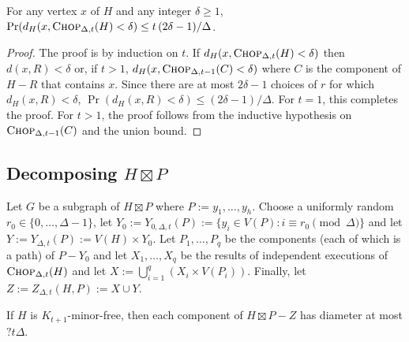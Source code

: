 \documentclass{patmorin}
\newcommand{\defin}[1]{\emph{\textcolor{brightmaroon}{#1}}}
\begin{document}

\begin{lem}\label{delta_bad_h}
  For any vertex $x$ of $H$ and any integer $\delta\ge 1$, $\Pr(d_H(x, \textsc{Chop}_{\Delta,t}(H)< \delta)\le t\,(2\delta-1)/\Delta$.
\end{lem}

\begin{proof}
  The proof is by induction on $t$.
  If $d_H(x,\textsc{Chop}_{\Delta,t}(H) < \delta)$ then $d(x,R)< \delta$ or, if $t>1$,  $d_H(x,\textsc{Chop}_{\Delta,t-1}(C) < \delta)$ where $C$ is the component of $H-R$ that contains $x$.  Since there are at most $2\delta-1$ choices of $r$ for which $d_H(x,R)<\delta$, $\Pr(d_H(x,R)<\delta) \le (2\delta-1)/\Delta$. For $t=1$, this completes the proof.  For $t>1$, the proof follows from the inductive hypothesis on $\textsc{Chop}_{\Delta,t-1}(C)$ and the union bound.
\end{proof}

\subsection{\boldmath Decomposing $H\boxtimes P$}

Let $G$ be a subgraph of $H\boxtimes P$ where $P:=y_1,\ldots,y_h$. Choose a uniformly random $r_0\in\{0,\ldots,\Delta-1\}$, let $Y_0:=Y_{0,\Delta,t}(P):=\{y_i\in V(P):i\equiv r_0\pmod\Delta\}$ and let $Y:=Y_{\Delta,t}(P):=V(H)\times Y_0$.  Let $P_1,\ldots,P_q$ be the components (each of which is a path) of $P-Y_0$ and let $X_1,\ldots,X_q$ be the results of independent executions of $\textsc{Chop}_{\Delta,t}(H)$ and let $X:=\bigcup_{i=1}^q (X_i\times V(P_i))$.  Finally, let $Z:=Z_{\Delta,t}(H,P):=X\cup Y$.


\begin{lem}\label{component_diameter}
  If $H$ is $K_{t+1}$-minor-free, then each component of $H\boxtimes P-Z$ has diameter at most $?t\Delta$.
\end{lem}
\end{document}
